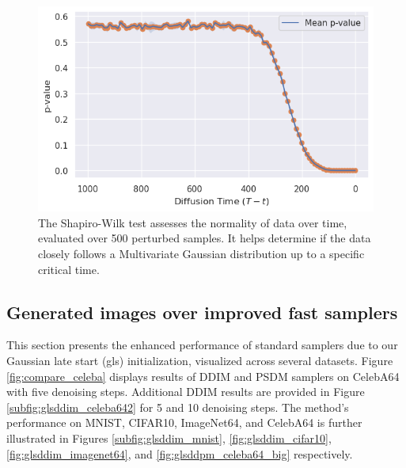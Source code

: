 \begin{figure}[!hb]
\endminipage%
%
  \includegraphics[width=\linewidth]{figs/plots/celeba64_gausianity_test.png}
\endminipage%
\caption{The Shapiro-Wilk test assesses the normality of data over time, evaluated over 500 perturbed samples. It helps determine if the data closely follows a Multivariate Gaussian distribution up to a specific critical time.}%
\label{fig:gaussianity-test}
\end{figure}

\newpage
\subsection{Generated images over improved fast samplers}

This section presents the enhanced performance of standard samplers due to our Gaussian late start (gls) initialization, visualized across several datasets. Figure \ref{fig:compare_celeba} displays results of DDIM and PSDM samplers on CelebA64 with five denoising steps. Additional DDIM results are provided in Figure \ref{subfig:glsddim_celeba642} for 5 and 10 denoising steps. The method's performance on MNIST, CIFAR10, ImageNet64, and CelebA64 is further illustrated in Figures \ref{subfig:glsddim_mnist}, \ref{fig:glsddim_cifar10}, \ref{fig:glsddim_imagenet64}, and \ref{fig:glsddpm_celeba64_big} respectively.

